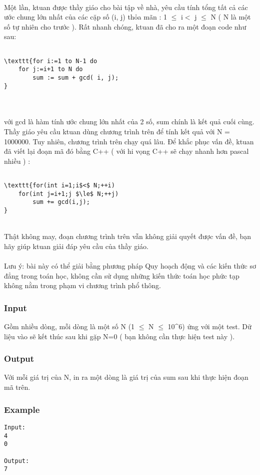 

 

Một lần, ktuan được thầy giáo cho bài tập về nhà, yêu cầu tính tổng tất cả các ước chung lớn nhất của các cặp số (i, j) thỏa mãn : 1 $\le$ i$<$ j $\le$ N ( N là một số tự nhiên cho trước ). Rất nhanh chóng, ktuan đã cho ra một đoạn code như sau:
\begin{verbatim}

\texttt{for i:=1 to N-1 do
    for j:=i+1 to N do
        sum := sum + gcd( i, j);
}\end{verbatim}


\\
\\với gcd là hàm tính ước chung lớn nhất của 2 số, sum chính là kết quả cuối cùng.
\\Thầy giáo yêu cầu ktuan dùng chương trình trên để tính kết quả với N = 1000000. Tuy nhiên, chương trình trên chạy quá lâu. Để khắc phục vấn đề, ktuan đã viết lại đoạn mã đó bằng C++ ( với hi vọng C++ sẽ chạy nhanh hơn pascal nhiều ) :
\begin{verbatim}

\texttt{for(int i=1;i$<$ N;++i)
    for(int j=i+1;j $\le$ N;++j)
        sum += gcd(i,j);
}\end{verbatim}


\\Thật không may, đoạn chương trình trên vẫn không giải quyết được vấn đề, bạn hãy giúp ktuan giải đáp yêu cầu của thầy giáo.
\\
\\Lưu ý: bài này có thể giải bằng phương pháp Quy hoạch động và các kiến thức sơ đẳng trong toán học, không cần sử dụng những kiến thức toán học phức tạp không nằm trong phạm vi chương trình phổ thông.

\subsubsection{Input}

Gồm nhiều dòng, mỗi dòng là một số N (1  $\le$  N  $\le$  10\textasciicircum6) ứng với một test. Dữ liệu vào sẽ kết thúc sau khi gặp N=0 ( bạn không cần thực hiện test này ).

\subsubsection{Output}

Với mỗi giá trị của N, in ra một dòng là giá trị của sum sau khi thực hiện đoạn mã trên.

\subsubsection{Example}
\begin{verbatim}
Input:
4
0

Output:
7
\end{verbatim}
